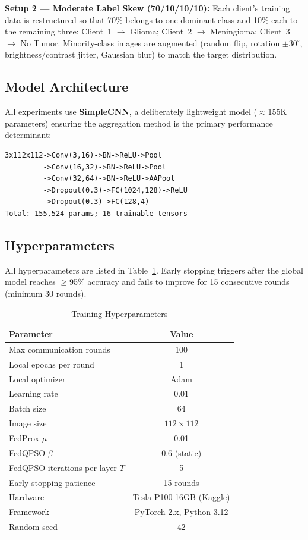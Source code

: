 \documentclass[conference]{IEEEtran}
\begin{document}
\textbf{Setup 2 --- Moderate Label Skew (70/10/10/10):} Each client's
training data is restructured so that 70\% belongs to one dominant class
and 10\% each to the remaining three: Client~1 $\to$ Glioma;
Client~2 $\to$ Meningioma; Client~3 $\to$ No Tumor. Minority-class images
are augmented (random flip, rotation $\pm30^\circ$, brightness/contrast
jitter, Gaussian blur) to match the target distribution.

\subsection{Model Architecture}
All experiments use \textbf{SimpleCNN}, a deliberately lightweight model
($\approx$155K parameters) ensuring the aggregation method is the primary
performance determinant:

{\small\begin{verbatim}
3x112x112->Conv(3,16)->BN->ReLU->Pool
         ->Conv(16,32)->BN->ReLU->Pool
         ->Conv(32,64)->BN->ReLU->AAPool
         ->Dropout(0.3)->FC(1024,128)->ReLU
         ->Dropout(0.3)->FC(128,4)
Total: 155,524 params; 16 trainable tensors
\end{verbatim}}

\subsection{Hyperparameters}
All hyperparameters are listed in Table~\ref{tab:hyperparams}. Early
stopping triggers after the global model reaches $\geq$95\% accuracy and
fails to improve for 15 consecutive rounds (minimum 30 rounds).

\begin{table}[htbp]
\caption{Training Hyperparameters}
\label{tab:hyperparams}
\begin{center}
\begin{tabular}{lc}
\hline
\textbf{Parameter} & \textbf{Value}\\
\hline
Max communication rounds & 100\\
Local epochs per round   & 1\\
Local optimizer          & Adam\\
Learning rate            & 0.01\\
Batch size               & 64\\
Image size               & $112 \times 112$\\
FedProx $\mu$            & 0.01\\
FedQPSO $\beta$          & 0.6 (static)\\
FedQPSO iterations per layer $T$ & 5\\
Early stopping patience  & 15 rounds\\
Hardware                 & Tesla P100-16GB (Kaggle)\\
Framework                & PyTorch 2.x, Python 3.12\\
Random seed              & 42\\
\hline
\end{tabular}
\end{center}
\end{table}
\end{document}
